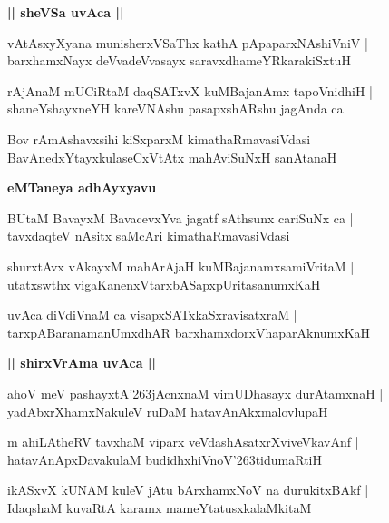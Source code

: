 \documentclass[twoside,12pt,openright]{book}
\def\S{\char'263}
\newcounter{shloka}[chapter]
\def\uvaca#1{\centerline{{\large\textbf{#1}}}}
\begin{document}
\uvaca{|| sheVSa uvAca ||}

\begin{shloka}%
vAtAsxyXyana munisherxVSaThx kathA pApaparxNAshiVniV |\\
barxhamxNayx deVvadeVvasayx saravxdhameYRkarakiSxtuH
\end{shloka}

\begin{shloka}%
rAjAnaM mUCiRtaM daqSATxvX kuMBajanAmx tapoVnidhiH |\\
shaneYshayxneYH kareVNAshu pasapxshARshu jagAnda ca 
\end{shloka}

\begin{shloka}%
Bov rAmAshavxsihi kiSxparxM kimathaRmavasiVdasi |\\
BavAnedxYtayxkulaseCxVtAtx mahAviSuNxH sanAtanaH 
\end{shloka}

\uvaca{ eMTaneya adhAyxyavu }

\begin{shloka}%
BUtaM BavayxM BavacevxYva jagatf sAthsunx cariSuNx ca |\\
tavxdaqteV nAsitx saMcAri kimathaRmavasiVdasi 
\end{shloka}

\begin{shloka}%
shurxtAvx vAkayxM mahArAjaH kuMBajanamxsamiVritaM |\\
utatxswthx vigaKanenxVtarxbASapxpUritasanumxKaH
\end{shloka}

\begin{shloka}%
uvAca diVdiVnaM ca visapxSATxkaSxravisatxraM |\\
tarxpABaranamanUmxdhAR barxhamxdorxVhaparAknumxKaH 
\end{shloka}

\uvaca{|| shirxVrAma uvAca ||}

\begin{shloka}%
ahoV meV pashayxtA\S jAcnxnaM vimUDhasayx durAtamxnaH |\\
yadAbxrXhamxNakuleV ruDaM hatavAnAkxmalovlupaH 
\end{shloka}

\begin{shloka}%
m ahiLAtheRV tavxhaM viparx veVdashAsatxrXviveVkavAnf |\\
hatavAnApxDavakulaM budidhxhiVnoV\S tidumaRtiH
\end{shloka}

\begin{shloka}%
ikASxvX kUNAM kuleV jAtu bArxhamxNoV na durukitxBAkf |\\
IdaqshaM kuvaRtA karamx mameYtatusxkalaMkitaM 
\end{shloka}
\end{document}
